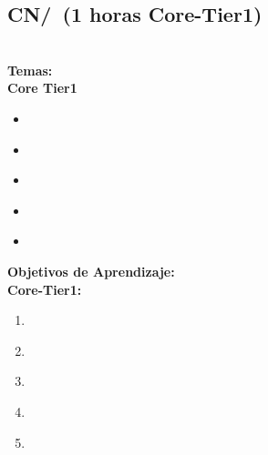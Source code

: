 \subsection{CN/\CNIntroductiontoModelingandSimulation~(1 horas Core-Tier1)}\label{sec:BOK:CNIntroductiontoModelingandSimulation}
\CNIntroductiontoModelingandSimulationDescription\\
\noindent \textbf{Temas:}\\
\noindent \textbf{Core Tier1}
\begin{itemize}
	\item \CNIntroductiontoModelingandSimulationTopicModels\label{sec:BOK:CNIntroductiontoModelingandSimulationTopicModels}
	\item \CNIntroductiontoModelingandSimulationTopicSimulations\label{sec:BOK:CNIntroductiontoModelingandSimulationTopicSimulations}
	\item \CNIntroductiontoModelingandSimulationTopicSimulation\label{sec:BOK:CNIntroductiontoModelingandSimulationTopicSimulation}
	\item \CNIntroductiontoModelingandSimulationTopicFoundational\label{sec:BOK:CNIntroductiontoModelingandSimulationTopicFoundational}
	\item \CNIntroductiontoModelingandSimulationTopicPresentation\label{sec:BOK:CNIntroductiontoModelingandSimulationTopicPresentation}
\end{itemize}


\noindent \textbf{Objetivos de Aprendizaje:}\\
\noindent \textbf{Core-Tier1:}
\begin{enumerate}
	\setcounter{enumi}{0}
	\item \CNIntroductiontoModelingandSimulationLODescribeTheModeling\xspace[\CNIntroductiontoModelingandSimulationLODescribeTheModelingLevel]\label{sec:BOK:CNIntroductiontoModelingandSimulationLODescribeTheModeling}
	\item \CNIntroductiontoModelingandSimulationLOCreate\xspace[\CNIntroductiontoModelingandSimulationLOCreateLevel]\label{sec:BOK:CNIntroductiontoModelingandSimulationLOCreate}
	\item \CNIntroductiontoModelingandSimulationLODifferentiate\xspace[\CNIntroductiontoModelingandSimulationLODifferentiateLevel]\label{sec:BOK:CNIntroductiontoModelingandSimulationLODifferentiate}
	\item \CNIntroductiontoModelingandSimulationLODescribeSeveral\xspace[\CNIntroductiontoModelingandSimulationLODescribeSeveralLevel]\label{sec:BOK:CNIntroductiontoModelingandSimulationLODescribeSeveral}
	\item \CNIntroductiontoModelingandSimulationLOCreateA\xspace[\CNIntroductiontoModelingandSimulationLOCreateALevel]\label{sec:BOK:CNIntroductiontoModelingandSimulationLOCreateA}
\end{enumerate}



